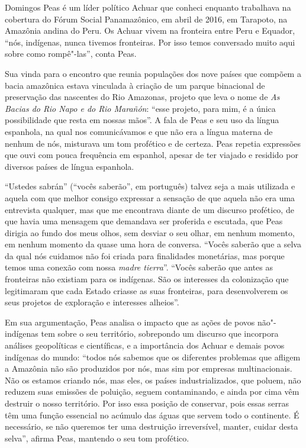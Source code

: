 \asterisc

Domingos Peas é um líder político Achuar que conheci enquanto trabalhava
na cobertura do Fórum Social Panamazônico, em abril de 2016, em
Tarapoto, na Amazônia andina do Peru. Os Achuar vivem na fronteira entre
Peru e Equador, ``nós, indígenas, nunca tivemos fronteiras. Por isso
temos conversado muito aqui sobre como rompê"-las'', conta Peas.

Sua vinda para o encontro que reunia populações dos nove países que
compõem a bacia amazônica estava vinculada à criação de um parque
binacional de preservação das nascentes do Rio Amazonas, projeto que
leva o nome de \emph{As Bacias do Rio Napo e do Rio Marañón}: ``esse
projeto, para mim, é a única possibilidade que resta em nossas mãos''. A
fala de Peas e seu uso da língua espanhola, na qual nos comunicávamos e
que não era a língua materna de nenhum de nós, misturava um tom
profético e de certeza. Peas repetia expressões que ouvi com pouca
frequência em espanhol, apesar de ter viajado e residido por diversos
países de língua espanhola.

``Ustedes sabrán'' (``vocês saberão'', em português) talvez seja a
mais utilizada e aquela com que melhor consigo expressar a
sensação de que aquela não era uma entrevista qualquer, mas que me
encontrava diante de um discurso profético, de que havia uma mensagem
que demandava ser proferida e escutada, que Peas dirigia ao fundo dos
meus olhos, sem desviar o seu olhar, em nenhum momento, em nenhum
momento da quase uma hora de conversa. ``Vocês saberão que a selva da
qual nós cuidamos não foi criada para finalidades monetárias, mas porque
temos uma conexão com nossa \emph{madre tierra}''. ``Vocês saberão que
antes as fronteiras não existiam para os indígenas. São os interesses da
colonização que legitimaram que cada Estado criasse as suas fronteiras,
para desenvolverem os seus projetos de exploração e interesses
alheios''.

Em sua argumentação, Peas analisa o impacto que as ações de povos
não"-indígenas tem sobre o seu território, sobrepondo um discurso que
incorpora análises geopolíticas e científicas, e a importância
dos Achuar e demais povos indígenas do mundo: ``todos nós
sabemos que os diferentes problemas que afligem a Amazônia não são
produzidos por nós, mas sim por empresas multinacionais. Não os estamos
criando nós, mas eles, os países industrializados, que poluem, não
reduzem suas emissões de poluição, seguem contaminando, e ainda por cima
vêm destruir o nosso território. Por isso essa posição de conservar,
pois essas serras têm uma função essencial no acúmulo das águas que
servem todo o continente. É necessário, se não queremos ter uma
destruição irreversível, manter, cuidar desta selva'', afirma Peas,
mantendo o seu tom profético.

